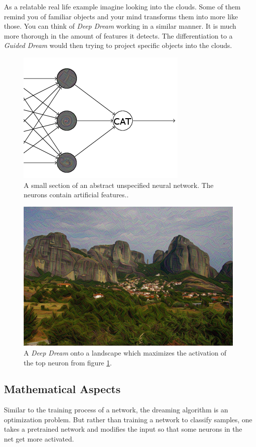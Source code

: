 As a relatable real life example imagine looking into the clouds.
Some of them remind you of familiar objects and your mind transforms them into more like those.
You can think of \emph{Deep Dream} working in a similar manner.
It is much more thorough in the amount of features it detects.
The differentiation to a \emph{Guided Dream} would then trying to project specific objects into the clouds.

\begin{figure}[H]
	\centering
	\includegraphics[width=0.5\linewidth]{img/neurons-reaction.png}
	\caption{A small section of an abstract unspecified neural network. The neurons contain artificial features.\cite{nielsen2015neural}.}
	\label{fig:neuronreact}
\end{figure}

\begin{figure}[H]
	\centering
	\includegraphics[width=0.7\linewidth]{img/applied_neuron.jpg}
	\caption{A \textit{Deep Dream} onto a landscape which maximizes the activation of the top neuron from figure \ref{fig:neuronreact}.}
	\label{fig:applieddream}
\end{figure}




\subsection{Mathematical Aspects}
Similar to the training process of a network, the dreaming algorithm is an optimization problem.
But rather than training a network to classify samples, one takes a pretrained network and modifies the input so that some neurons in the net get more activated.


